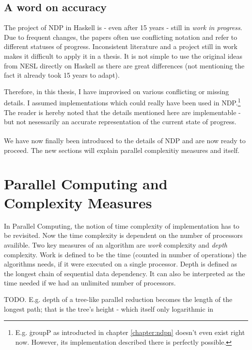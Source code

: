   \subsection{A word on accuracy}
    The project of NDP in Haskell is - even after 15 years -
    still in \textit{work in progress}. Due to frequent changes,
    the papers often use conflicting notation and refer to
    different statuses of progress. Inconsistent literature and a project still in work makes it difficult
    to apply it in a thesis. It is not simple to use the original ideas from
    NESL directly on Haskell as there are great differences (not mentioning
    the fact it already took 15 years to adapt).
    
    Therefore, in this thesis, I have improvised on various conflicting or
    missing details. I assumed implementations which could really have been
    used in NDP.\footnote{E.g. \c{groupP} as introducted in chapter \ref{chapter:ndpn} doesn't
    even exist right now. However, its implementation described there is perfectly possible.}
    The reader is hereby noted that the details
    mentioned here are implementable - but not nesessarily an accurate
    representation of the current state of progress.
    
    
  \paragraph{}
    We have now finally been introduced to the details of NDP and
    are now ready to proceed. The new sections will explain
    parallel complexitiy measures and \algo itself.
  
  \clearpage
  
\section{Parallel Computing and Complexity Measures}
  In Parallel Computing, the notion of time complexity of implementation
  has to be revisited. Now the time complexity is dependent on the
  number of processors availible. Two key measures of
  an algorithm are \emph{work} complexity
  and \emph{depth} complexity. Work is defined
  to be the time (counted in number of operations)
  the algorithms needs, if it were executed on a single processor.
  Depth is defined as the longest chain of sequential data dependency.
  It can also be interpreted as the time needed if we had
  an unlimited number of processors.
  
  
  TODO. 
  E.g. depth of a tree-like parallel reduction becomes the
  length of the longest path; that is the tree's height - which
  itself only logarithmic in
  
